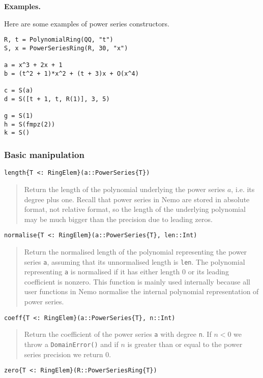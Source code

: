 \documentclass[a4paper,10pt]{article}
\newcommand{\code}{\lstinline}
\newcommand{\desc}[1]{\vspace{-3mm}\begin{quote}#1\end{quote}}
\begin{document}
\textbf{Examples.}

Here are some examples of power series constructors.

\begin{lstlisting}
R, t = PolynomialRing(QQ, "t")
S, x = PowerSeriesRing(R, 30, "x")

a = x^3 + 2x + 1
b = (t^2 + 1)*x^2 + (t + 3)x + O(x^4)

c = S(a)
d = S([t + 1, t, R(1)], 3, 5)

g = S(1)
h = S(fmpz(2))
k = S()
\end{lstlisting}

\subsubsection{Basic manipulation}

\begin{lstlisting}
length{T <: RingElem}(a::PowerSeries{T})
\end{lstlisting}

\desc{Return the length of the polynomial underlying the power series $a$, i.e.
its degree plus one. Recall that power series in Nemo are stored in absolute
format, not relative format, so the length of the underlying polynomial may be
much bigger than the precision due to leading zeros.}

\begin{lstlisting}
normalise{T <: RingElem}(a::PowerSeries{T}, len::Int)
\end{lstlisting}

\desc{Return the normalised length of the polynomial representing the power
series \code{a}, assuming that its unnormalised length is \code{len}. The
polynomial representing \code{a} is normalised if it has either length $0$
or its leading coefficient is nonzero. This function is mainly used internally
because all user functions in Nemo normalise the internal polynomial
representation of power series.}

\begin{lstlisting}
coeff{T <: RingElem}(a::PowerSeries{T}, n::Int)
\end{lstlisting}

\desc{Return the coefficient of the power series \code{a} with degree 
\code{n}. If $n < 0$ we throw a \code{DomainError()} and if $n$ is greater
than or equal to the power series precision we return $0$.}

\begin{lstlisting}
zero{T <: RingElem}(R::PowerSeriesRing{T})
\end{lstlisting}
\end{document}
